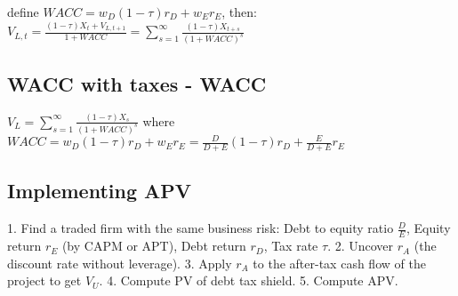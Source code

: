define $WACC = w_D (1-\tau)r_D + w_E r_E$, then: \\

$V_{L,t} = \frac{(1-\tau)X_t + V_{L,t+1}}{1+WACC} = \sum_{s=1}^{\infty} \frac{(1-\tau)X_{t+s}}{(1+WACC)^s}$

\subsection*{WACC with taxes - WACC}

$V_L = \sum_{s=1}^{\infty} \frac{(1-\tau)X_{s}}{(1+WACC)^s}$ where $WACC = w_D (1-\tau)r_D + w_E r_E = \frac{D}{D+E} (1-\tau) r_D + \frac{E}{D+E}r_E $

\subsection*{Implementing APV}

1. Find a traded firm with the same business risk: Debt to equity ratio $\frac{D}{E}$, Equity return $r_E$ (by CAPM or APT), Debt return $r_D$, Tax rate $\tau$.
2. Uncover $r_A$ (the discount rate without leverage).
3. Apply $r_A$ to the after-tax cash flow of the project to get $V_U$.
4. Compute PV of debt tax shield.
5. Compute APV.